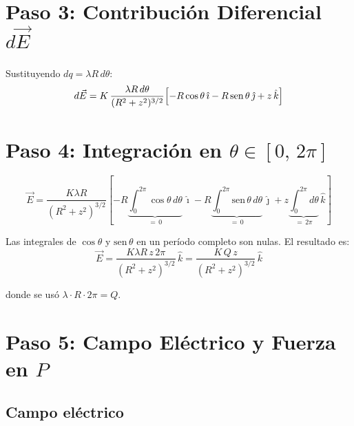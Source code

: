 \documentclass[12pt,letterpaper]{article}
\begin{document}
\section*{Paso 3: Contribuci\'on Diferencial $d\vec{E}$}

Sustituyendo $dq = \lambda R\,d\theta$:
\begin{equation*}
    d\vec{E} = K\,\frac{\lambda R\,d\theta}{(R^2+z^2)^{3/2}}
    \Bigl[-R\cos\theta\,\hat{\imath} - R\,\text{sen}\,\theta\,\hat{\jmath} + z\,\hat{k}\Bigr]
\end{equation*}

\section*{Paso 4: Integraci\'on en $\theta \in [0,\,2\pi]$}

\begin{equation*}
    \vec{E}
    = \frac{K\lambda R}{(R^2+z^2)^{3/2}}
    \left[
        -R\underbrace{\int_0^{2\pi}\cos\theta\,d\theta}_{=\,0}\,\hat{\imath}
        -R\underbrace{\int_0^{2\pi}\text{sen}\,\theta\,d\theta}_{=\,0}\,\hat{\jmath}
        +z\underbrace{\int_0^{2\pi}d\theta}_{=\,2\pi}\,\hat{k}
    \right]
\end{equation*}

Las integrales de $\cos\theta$ y $\text{sen}\,\theta$ en un per\'iodo completo son nulas. El resultado es:
\begin{equation*}
    \vec{E} = \frac{K\lambda R\,z\,2\pi}{(R^2+z^2)^{3/2}}\,\hat{k}
    = \frac{K\,Q\,z}{(R^2+z^2)^{3/2}}\,\hat{k}
\end{equation*}

donde se us\'o $\lambda\cdot R\cdot 2\pi = Q$.

\section*{Paso 5: Campo El\'ectrico y Fuerza en $P$}

\subsection*{Campo el\'ectrico}
\end{document}
